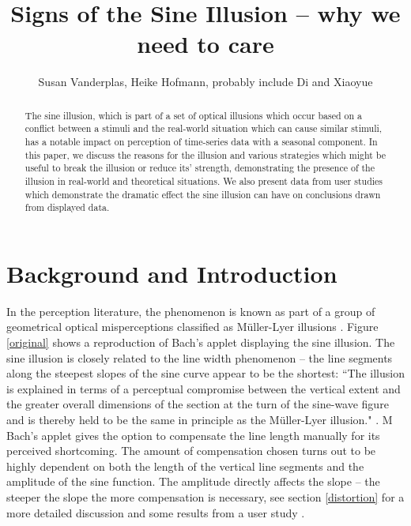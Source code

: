 \documentclass[11pt]{article}\usepackage{graphicx, color}
\title{Signs of the Sine Illusion -- why we need to care}
\author{Susan Vanderplas, Heike Hofmann, probably include Di and Xiaoyue}
\begin{document}
\maketitle
\begin{abstract}
The sine illusion, which is part of a set of optical illusions which occur based on a conflict between a stimuli and the real-world situation which can cause similar stimuli, has a notable impact on perception of time-series data with a seasonal component. In this paper, we discuss the reasons for the illusion and various strategies which might be useful to break the illusion or reduce its' strength, demonstrating the presence of the illusion in real-world and theoretical situations. We also present data from user studies which demonstrate the dramatic effect the sine illusion can have on conclusions drawn from displayed data.
\end{abstract}
\tableofcontents
\section{Background and Introduction}


In the perception literature, the phenomenon is known as part of a group of geometrical optical misperceptions classified as M\"uller-Lyer illusions \citep{day:1991}. Figure \ref{original} shows a reproduction of Bach's applet \citep{bach} displaying the sine illusion. The sine illusion is closely related to the line width phenomenon -- the line segments along the steepest slopes of the sine curve appear to be the shortest: ``The illusion is explained in terms of a perceptual compromise between the vertical extent and the greater overall dimensions of the section at the turn of the sine-wave figure and is thereby held to be the same in principle as the M\"uller-Lyer illusion." \citep{day:1991}.
M Bach's applet  gives the option to compensate the line length manually for its perceived shortcoming. The amount of compensation chosen turns out to be highly dependent on both the length of the vertical line segments and the amplitude of the sine function. The amplitude directly affects the slope -- the steeper  the slope the more compensation is necessary, see section \ref{distortion}  for a more detailed discussion and some results from a user study  .
\end{document}
